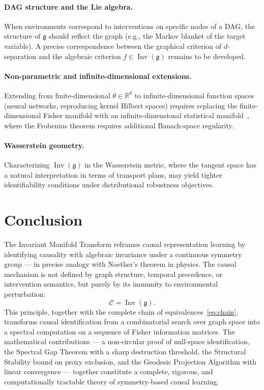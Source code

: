 \documentclass[11pt,a4paper]{article}
\DeclareMathOperator{\Inv}{Inv}
\newcommand{\g}{\mathfrak{g}}
\newcommand{\cC}{\mathcal{C}}
\newcommand{\bR}{\mathbb{R}}
\begin{document}
\paragraph{DAG structure and the Lie algebra.} When environments correspond to interventions on specific nodes of a DAG, the structure of $\g$ should reflect the graph (e.g., the Markov blanket of the target variable). A precise correspondence between the graphical criterion of $d$-separation and the algebraic criterion $f \in \Inv(\g)$ remains to be developed.

\paragraph{Non-parametric and infinite-dimensional extensions.} Extending from finite-dimensional $\theta \in \bR^d$ to infinite-dimensional function spaces (neural networks, reproducing kernel Hilbert spaces) requires replacing the finite-dimensional Fisher manifold with an infinite-dimensional statistical manifold~\cite{amari2000}, where the Frobenius theorem requires additional Banach-space regularity.

\paragraph{Wasserstein geometry.} Characterizing $\Inv(\g)$ in the Wasserstein metric, where the tangent space has a natural interpretation in terms of transport plans, may yield tighter identifiability conditions under distributional robustness objectives.

\section*{Conclusion}

The Invariant Manifold Transform reframes causal representation learning by identifying causality with algebraic invariance under a continuous symmetry group — in precise analogy with Noether's theorem in physics. The causal mechanism is not defined by graph structure, temporal precedence, or intervention semantics, but purely by its immunity to environmental perturbation:
\[
\boxed{\cC = \Inv(\g).}
\]
This principle, together with the complete chain of equivalences~\eqref{eq:chain}, transforms causal identification from a combinatorial search over graph space into a spectral computation on a sequence of Fisher information matrices. The mathematical contributions — a non-circular proof of null-space identification, the Spectral Gap Theorem with a sharp destruction threshold, the Structural Stability bound on proxy exclusion, and the Geodesic Projection Algorithm with linear convergence — together constitute a complete, rigorous, and computationally tractable theory of symmetry-based causal learning.
\end{document}
